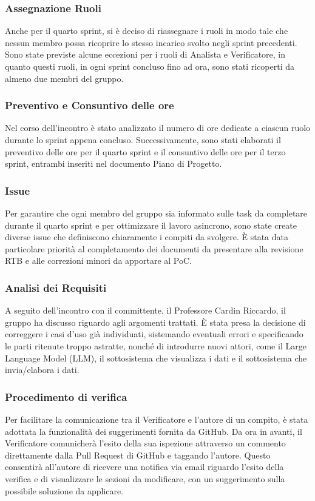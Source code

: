 \documentclass[10pt]{article}
\begin{document}
\subsubsection{Assegnazione Ruoli}
Anche per il quarto sprint, si è deciso di riassegnare i ruoli in modo tale che nessun membro possa ricoprire lo stesso incarico svolto negli sprint precedenti. Sono state previste alcune eccezioni per i ruoli di Analista e Verificatore, in quanto questi ruoli, in ogni sprint concluso fino ad ora, sono stati ricoperti da almeno due membri del gruppo.

\subsubsection{Preventivo e Consuntivo delle ore}
Nel corso dell'incontro è stato analizzato il numero di ore dedicate a ciascun ruolo durante lo sprint appena concluso. Successivamente, sono stati elaborati il preventivo delle ore per il quarto sprint e il consuntivo delle ore per il terzo sprint, entrambi inseriti nel documento Piano di Progetto.

\subsubsection{Issue}
Per garantire che ogni membro del gruppo sia informato sulle task da completare durante il quarto sprint e per ottimizzare il lavoro asincrono, sono state create diverse issue che definiscono chiaramente i compiti da svolgere. È stata data particolare priorità al completamento dei documenti da presentare alla revisione RTB e alle correzioni minori da apportare al PoC.

\subsubsection{Analisi dei Requisiti}
A seguito dell'incontro con il committente, il Professore Cardin Riccardo, il gruppo ha discusso riguardo agli argomenti trattati. È stata presa la decisione di correggere i casi d'uso già individuati, sistemando eventuali errori e specificando le parti ritenute troppo astratte, nonché di introdurre nuovi attori, come il Large Language Model (LLM), il sottosistema che visualizza i dati e il sottosistema che invia/elabora i dati.

\subsubsection{Procedimento di verifica}
Per facilitare la comunicazione tra il Verificatore e l'autore di un compito, è stata adottata la funzionalità dei suggerimenti fornita da GitHub. Da ora in avanti, il Verificatore comunicherà l'esito della sua ispezione attraverso un commento direttamente dalla Pull Request di GitHub e taggando l'autore. Questo consentirà all'autore di ricevere una notifica via email riguardo l'esito della verifica e di visualizzare le sezioni da modificare, con un suggerimento sulla possibile soluzione da applicare.
\end{document}
